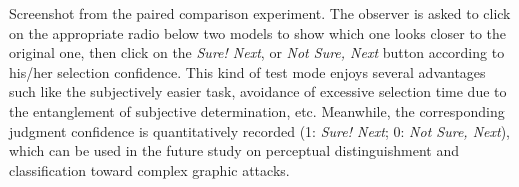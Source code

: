 Screenshot from the paired comparison experiment. The observer is asked to click on the appropriate radio below two models to show which one looks closer to the original one, then click on the \emph{Sure! Next}, or \emph{Not Sure, Next} button according to his/her selection confidence.  This kind of test mode enjoys several advantages such like the subjectively easier task,  avoidance of  excessive selection time due to the entanglement of subjective determination, etc. Meanwhile, the corresponding judgment confidence is quantitatively recorded (1: \emph{Sure! Next}; 0: \emph{Not Sure, Next}), which can be used in the future study on perceptual distinguishment and  classification toward complex graphic attacks. 